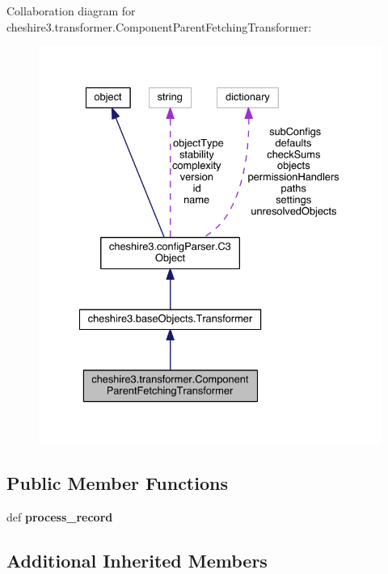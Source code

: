 Collaboration diagram for cheshire3.\-transformer.\-Component\-Parent\-Fetching\-Transformer\-:
\nopagebreak
\begin{figure}[H]
\begin{center}
\leavevmode
\includegraphics[width=331pt]{classcheshire3_1_1transformer_1_1_component_parent_fetching_transformer__coll__graph}
\end{center}
\end{figure}
\subsection*{Public Member Functions}
\begin{DoxyCompactItemize}
\item 
\hypertarget{classcheshire3_1_1transformer_1_1_component_parent_fetching_transformer_a5fc9f5f916318bc8828c82e87b726903}{def {\bfseries process\-\_\-record}}\label{classcheshire3_1_1transformer_1_1_component_parent_fetching_transformer_a5fc9f5f916318bc8828c82e87b726903}

\end{DoxyCompactItemize}
\subsection*{Additional Inherited Members}


